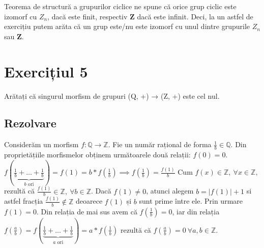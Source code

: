 \documentclass{article}
\begin{document}
Teorema de structură a grupurilor ciclice ne spune că orice grup ciclic este izomorf cu $Z_{n}$, dacă este finit, respectiv $\mathbf{Z}$ dacă este infinit. Deci, la un astfel de exercițiu putem arăta că un grup este/nu este izomorf cu unul dintre grupurile $Z_{n}$ sau $\mathbf{Z}$.



\section{Exercițiul 5}
Arătați că singurul morfism de grupuri (Q, +) → (Z, +) este cel nul.

\subsection{Rezolvare}
Considerăm un morfism $f:\mathbb{Q} \rightarrow \mathbb{Z}$. Fie un număr rațional de forma $\frac{1}{b} \in \mathbb{Q}$.
Din proprietățiile morfismelor obținem următoarele două relații:
\newline
$f(0) = 0$.  
\newline
$f(\underbrace{\frac{1}{b} + \dots + \frac{1}{b}}_{b \text{ ori}} ) = f(1) = b*f(\frac{1}{b})  \implies f(\frac{1}{b})=\frac{f(1)}{b}$
\newline
\newline
Cum $f(x) \in \mathbb{Z}, \ \forall x \in \mathbb{Z},$ rezultă că $\frac{f(1)}{b} \in \mathbb{Z}, \ \forall b \in \mathbb{Z}$. Dacă $f(1) \not= 0$, atunci alegem $b = |f(1)| + 1$ si astfel fracția $\frac{f(1)}{b} \not\in \mathbb{Z}$ deoarece $f(1)$ și $b$ sunt prime între ele. Prin urmare $f(1) = 0$.
\newline
Din relația de mai sus avem că $f(\frac{1}{b}) = 0$, iar din relația $f(\frac{a}{b})=f(\underbrace{\frac{1}{b} + \dots + \frac{1}{b}}_{a \text{ ori}} ) = a * f(\frac{1}{b})$ rezultă că $f(\frac{a}{b}) = 0 \ \forall a, b \in \mathbb{Z}.$
\end{document}
